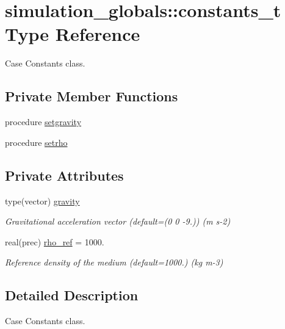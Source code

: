 \hypertarget{structsimulation__globals_1_1constants__t}{}\section{simulation\+\_\+globals\+:\+:constants\+\_\+t Type Reference}
\label{structsimulation__globals_1_1constants__t}


Case Constants class.  


\subsection*{Private Member Functions}
\begin{DoxyCompactItemize}
\item 
procedure \hyperlink{structsimulation__globals_1_1constants__t_a5037e6304087d5731de4aa741ea25a62}{setgravity}
\item 
procedure \hyperlink{structsimulation__globals_1_1constants__t_a67ddcf6c24df193c78cfd51574b49e4d}{setrho}
\end{DoxyCompactItemize}
\subsection*{Private Attributes}
\begin{DoxyCompactItemize}
\item 
type(vector) \hyperlink{structsimulation__globals_1_1constants__t_a4eec4dda6ff156f096dbfbaac5ea2a6b}{gravity}
\begin{DoxyCompactList}\small\item\em Gravitational acceleration vector (default=(0 0 -\/9.)) (m s-\/2) \end{DoxyCompactList}\item 
real(prec) \hyperlink{structsimulation__globals_1_1constants__t_af9496305e46cea74e54758362274a701}{rho\+\_\+ref} = 1000.
\begin{DoxyCompactList}\small\item\em Reference density of the medium (default=1000.) (kg m-\/3) \end{DoxyCompactList}\end{DoxyCompactItemize}


\subsection{Detailed Description}
Case Constants class. 

